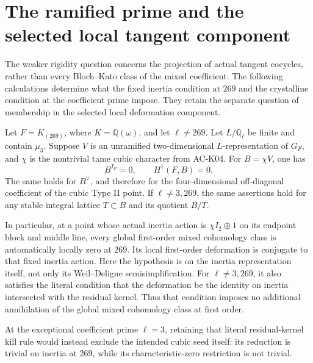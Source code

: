 \section{The ramified prime and the selected local tangent component}
\label{sec:cubic-local-tangent}

The weaker rigidity question concerns the projection of actual tangent
cocycles, rather than every Bloch--Kato class of the mixed coefficient.
The following calculations determine what the fixed inertia condition
at $269$ and the crystalline condition at the coefficient prime impose.
They retain the separate question of membership in the selected local
deformation component.

\begin{proposition}
\label{AC-G47}
Let $F=K_{(269)}$, where $K=\mathbb Q(\omega)$, and let
$\ell\ne269$.  Let $L/\mathbb Q_\ell$ be finite and contain
$\mu_3$.  Suppose $V$ is an unramified two-dimensional
$L$-representation of $G_F$, and $\chi$ is the nontrivial
tame cubic character from AC-K04.  For
$B=\chi V$, one has
\[
             B^{I_F}=0,\qquad H^1(F,B)=0.             \tag{G47.1}
\]
The same holds for $B^\vee$, and therefore for the four-dimensional
off-diagonal coefficient of the cubic Type II point.
If $\ell\ne3,269$, the same assertions hold for any stable
integral lattice $T\subset B$ and its quotient $B/T$.

In particular, at a point whose actual inertia action is
$\chi I_2\oplus1$ on its endpoint block and middle line,
every global first-order mixed
cohomology class is automatically locally zero at $269$.
Its local first-order deformation is conjugate to that fixed
inertia action.  Here the hypothesis is on the inertia representation
itself, not only its Weil--Deligne semisimplification.
For $\ell\ne3,269$, it also satisfies the
literal condition that the deformation be the identity on
inertia intersected with the residual kernel.  Thus that
condition imposes no additional annihilation of the global
mixed cohomology class at first order.

At the exceptional coefficient prime $\ell=3$, retaining
that literal residual-kernel kill rule would instead exclude
the intended cubic seed itself: its reduction is trivial on
inertia at $269$, while its characteristic-zero restriction
is not trivial.
\end{proposition}
